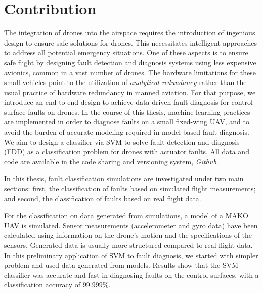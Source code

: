 \section{Contribution}

The integration of drones into the airspace requires the introduction of ingenious design to ensure safe solutions for drones. This necessitates intelligent approaches to address all potential emergency situations. One of these aspects is to ensure safe flight by designing fault detection and diagnosis systems using less expensive avionics, common in a vast number of drones.
The hardware limitations for these small vehicles point to the utilization of \emph{analytical redundancy} rather than the usual practice of hardware redundancy in manned aviation. 
For that purpose, we introduce an end-to-end design to achieve data-driven fault diagnosis for control surface faults on drones.
In the course of this thesis, machine learning practices are implemented in order to diagnose faults on a small fixed-wing UAV, and to avoid the burden of accurate modeling required in model-based fault diagnosis. 
We aim to design a classifier via SVM to solve fault detection and diagnosis (FDD) as a classification problem for drones with actuator faults.
All data and code are available in the code sharing and versioning system, \emph{Github}. 

In this thesis, fault classification simulations are investigated under two main sections: first, the classification of faults based on simulated flight measurements; and second, the classification of faults based on real flight data. 

For the classification on data generated from simulations, a model of a MAKO UAV \cite{baskaya2017flight} is simulated.
Sensor measurements (accelerometer and gyro data) have been calculated using information on the drone's motion and the specifications of the sensors. 
Generated data is usually more structured compared to real flight data. 
In this preliminary application of SVM to fault diagnosis, we started with simpler problem and used data generated from models.
Results show that the SVM classifier was accurate and fast in diagnosing faults on the control surfaces, with a classification accuracy of $99.999\%$.

